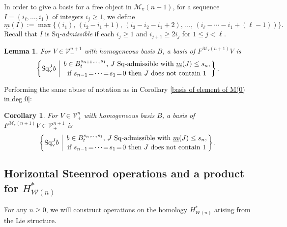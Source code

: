 \documentclass[11pt]{amsart} \renewcommand{\baselinestretch}{1.2}
\theoremstyle{plain}
\newtheorem{lem}[thm]{Lemma}
\newtheorem{cor}[thm]{Corollary}
\numberwithin{equation}{section} %
\theoremstyle{plain}
\newtheorem{lem}[thm]{Lemma}
\newtheorem{cor}[thm]{Corollary}
\numberwithin{equation}{chapter} %
\newcommand{\calV}{\mathcal{V}}
\newcommand{\calw}{\mathcal{W}}
\newcommand{\calMv}{\mathcal{M}\dver}
\newcommand{\vect}[2]{\calV^{#1}_{#2}}
\newcommand{\minDimSq}{\underline{m}}
\newcommand{\Sq}{\mathrm{Sq}}
\newcommand{\dver}{_\mathrm{v}}
\newcommand{\SubsectionOrSection}[1]{\subsection{#1}}
\begin{document}
\begin{Cohomology Operations for W and U}
In order to give a basis for a free object in $\calMv(n+1)$, for a sequence $I=(i_\ell,\ldots,i_1)$ of integers $i_j\geq1$, we define
\[\minDimSq(I):=\max\{(i_1),\,(i_2-i_1+1),\,(i_3-i_2-i_1+2),\,\ldots,\,(i_{\ell}-\cdots-i_1+(\ell-1))\}.
\]
Recall that $I$ is \emph{$\Sq$-admissible} if each $i_j\geq1$ and $i_{j+1}\geq 2i_j$ for $1\leq j <\ell$.
\begin{lem}
\label{basis of element of M(n+1)}
For $V\in\vect{n+1}{+}$ with homogeneous basis $B$, a basis of $F^{\calMv(n+1)}V$ is
\[\left\{\Sq\dver^Jb\ \middle|\ \genfrac{}{}{0pt}{}{b\in B^{s_{n+1},\ldots,s_1}_t\textup{, $J$ $\Sq$-admissible with }\minDimSq(J)\leq s_n,}{\textup{if }s_{n-1}\!=\!\cdots\!=\!s_1\!=\!0\textup{ then $J$ does not contain 1}}\right\}.\]
\end{lem}
Performing the same abuse of notation as in Corollary \ref{basis of element of M(0) in deg 0}:
\begin{cor}
\label{basis of element of M(n+1) in deg 0}
For $V\in\vect{n}{+}$ with homogeneous basis $B$, a basis of $F^{\calMv(n+1)}V\in\vect{n+1}{+}$ is
\[\left\{\Sq\dver^Jb\ \middle|\ \genfrac{}{}{0pt}{}{b\in B^{s_{n},\ldots,s_1}_t\textup{, $J$ $\Sq$-admissible with }\minDimSq(J)\leq s_n,}{\textup{if }s_{n-1}\!=\!\cdots\!=\!s_1\!=\!0\textup{ then $J$ does not contain 1}}\right\}.\]
\end{cor}

\SubsectionOrSection{Horizontal Steenrod operations and a product for $H^*_{\calw(n)}$}\label{Horizontal Steenrod operations and a product for HWn}
For any $n\geq 0$, we will construct operations on the homology $H^*_{\calw(n)}$ arising from the Lie structure.


\end{Cohomology Operations for W and U}
\end{document}
